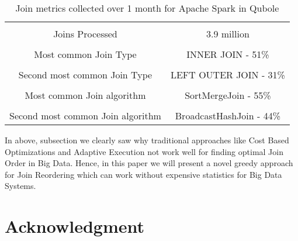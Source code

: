 \documentclass[conference]{IEEEtran}
\begin{document}
\begin{table}[h]
\begin{center}
\begin{tabular}{ |c|c| }
 \hline \\
Joins Processed & 3.9 million \\ \hline \\
Most common Join Type & INNER JOIN - 51\%  \\  \hline \\
Second most common Join Type &  LEFT OUTER JOIN - 31\%\\ \hline  \\
Most common Join algorithm & SortMergeJoin - 55\%\\ \hline \\
Second most common Join algorithm & BroadcastHashJoin - 44\%\\
 \hline
\end{tabular}
\label{tab:stats}
\end{center}
\caption{Join metrics collected over 1 month for Apache Spark in Qubole}
\end{table}




In above, subsection we clearly saw why traditional approaches like Cost Based Optimizations and Adaptive Execution not work well for finding optimal Join Order in Big Data. Hence, in this paper we will present a novel greedy approach for Join Reordering which can work without expensive statistics for Big Data Systems.




\section*{Acknowledgment}
\end{document}
